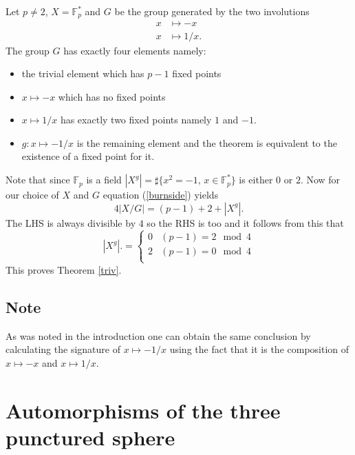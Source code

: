 \documentclass[12pt,a4paper]{amsart}
\def\fp{\mathbb{F}_p}
\begin{document}
Let $p\neq 2$,  $X = \fp^*$ and $G$ be the group generated by the two involutions
\begin{eqnarray*}
x & \mapsto -x \\
x & \mapsto 1/x.
\end{eqnarray*}
The group  $G$ has exactly four elements namely:
\begin{itemize}
\item the trivial element which has  $p-1$ fixed points
\item $x\mapsto -x$ which has no fixed points 
\item  $x\mapsto 1/x$ has exactly two fixed points namely $1$ and $-1$.
\item  $g:x \mapsto -1/x$ is the remaining element and the theorem is equivalent to the existence of a fixed point for it.
\end{itemize}
Note that since $\fp$ is a field 
$|X^g| = \sharp \{x^2 = -1, \, x\in \fp^* \}$
is either $0$ or $2$.
Now for our choice of $X$ and $G$ equation (\ref{burnside}) yields
\begin{equation}
4 |X/G|   = (p-1) + 2 + |X^g|.
\end{equation}  
The LHS is always divisible by $4$ so the  RHS is too and
it follows from this that
$$ |X^g|. = \left\{  \begin{array}{ll}
0 & (p-1) =  2 \mod 4 \\
2 & (p-1) =  0 \mod 4 \\
\end{array}
\right.
$$
This proves Theorem \ref{triv}.

\subsection*{Note}
As was noted in the introduction one can obtain the same conclusion 
by calculating the signature of $x\mapsto -1/x$ 
using the fact that it is  the composition of
$x \mapsto -x$ and $x \mapsto 1/x$.


\section{Automorphisms of the three punctured sphere}
\end{document}
